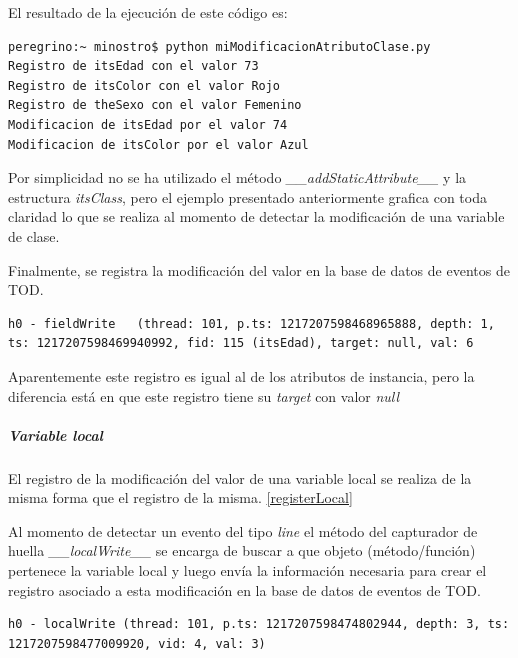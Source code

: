 \documentclass[12pt,legalpaper]{report}
\begin{document}
El resultado de la ejecución de este código es:

\begin{singlespace}
\begin{lstlisting}[style=consola,numbers=none]
peregrino:~ minostro$ python miModificacionAtributoClase.py
Registro de itsEdad con el valor 73
Registro de itsColor con el valor Rojo
Registro de theSexo con el valor Femenino
Modificacion de itsEdad por el valor 74
Modificacion de itsColor por el valor Azul
\end{lstlisting}
\end{singlespace}

Por simplicidad no se ha utilizado el método  \textit{\_\_addStaticAttribute\_\_} y la estructura \textit{itsClass}, pero el ejemplo presentado anteriormente grafica con toda claridad lo que se realiza al momento de detectar la modificación de una variable de clase.

Finalmente, se registra la modificación del valor en la base de datos de eventos de TOD.

\begin{singlespace}
\begin{lstlisting}[style=consola,numbers=none]
h0 - fieldWrite   (thread: 101, p.ts: 1217207598468965888, depth: 1, ts: 1217207598469940992, fid: 115 (itsEdad), target: null, val: 6
\end{lstlisting}
\end{singlespace}

Aparentemente este registro es igual al de los atributos de instancia, pero la diferencia está en que este registro tiene su \textit{target} con valor \textit{null}
	
					\subparagraph{Variable local}

El registro de la modificación del valor de una variable local se realiza de la misma forma que el registro de la misma. \ref{registerLocal}

Al momento de detectar un evento del tipo \textit{line} el método del capturador de huella \textit{\_\_localWrite\_\_} se encarga de buscar a 	que objeto (método/función) pertenece la variable local y luego envía la información necesaria para crear el registro asociado a esta modificación en la base de datos de eventos de TOD.\\

\begin{singlespace}
\begin{lstlisting}[style=consola,numbers=none]
h0 - localWrite (thread: 101, p.ts: 1217207598474802944, depth: 3, ts: 1217207598477009920, vid: 4, val: 3)
\end{lstlisting}
\end{singlespace}					
\end{document}
